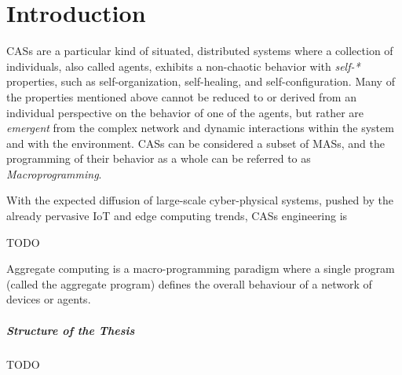 \chapter{Introduction}
\label{chap:introduction}
\acp{CAS} are a particular kind of situated, distributed systems where a collection of individuals, also called agents, exhibits a non-chaotic behavior with \textit{self-*} properties, such as self-organization, self-healing, and self-configuration\cite{macroprogramming-state-of-the-art}.
%
Many of the properties mentioned above cannot be reduced to or derived from an individual perspective on the behavior of one of the agents, but rather are \textit{emergent} from the complex network and dynamic interactions within the system and with the environment\cite{macroprogramming-state-of-the-art}.
%
\acp{CAS} can be considered a subset of \acp{MAS}, and the programming of their behavior as a whole can be referred to as \textit{Macroprogramming}\cite{macroprogramming-state-of-the-art}.

With the expected diffusion of large-scale cyber-physical systems, pushed by the already pervasive \ac{IoT} and edge computing trends\cite{scafi}, \acp{CAS} engineering is 

TODO


Aggregate computing is a macro-programming paradigm where a single program (called the aggregate program) defines the overall behaviour of a network of devices or agents\cite{macroprogramming-state-of-the-art}.

\paragraph{Structure of the Thesis}

TODO
